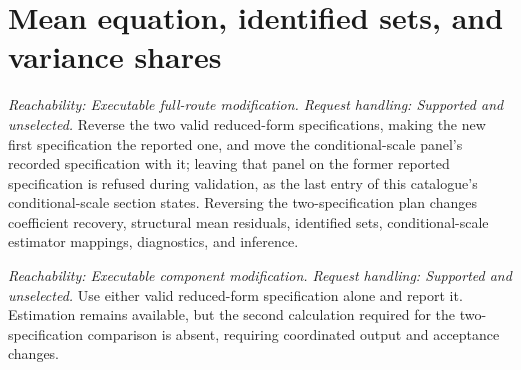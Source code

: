 \documentclass[11pt]{article}
\begin{document}
\section{Mean equation, identified sets, and variance shares}

\begin{description}[style=nextline]
\item[Reordered two-specification mean plan.]
\emph{Reachability: Executable full-route modification. Request handling: Supported and unselected.}
Reverse the two valid reduced-form specifications, making the new first specification the reported
one, and move the conditional-scale panel's recorded specification with it; leaving that panel on the
former reported specification is refused during validation, as the last entry of this catalogue's
conditional-scale section states. Reversing the two-specification plan changes coefficient recovery,
structural mean residuals, identified sets, conditional-scale estimator
mappings, diagnostics, and inference.

\item[Single-specification mean plan.]
\emph{Reachability: Executable component modification. Request handling: Supported and unselected.}
Use either valid reduced-form specification alone and report it. Estimation remains available, but
the second calculation required for the two-specification comparison is absent, requiring coordinated output and
acceptance changes.


\end{description}
\end{document}
